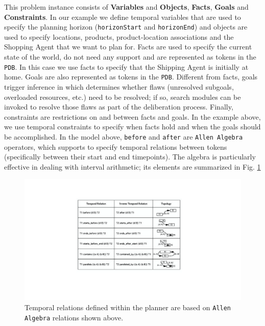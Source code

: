 This problem instance consists of \textbf{Variables} and
\textbf{Objects}, \textbf{Facts}, \textbf{Goals} and
\textbf{Constraints}. In our example we define temporal variables that
are used to specify the planning horizon (\texttt{horizonStart} and
\texttt{horizonEnd}) and objects are used to specify locations,
products, product-location associations and the Shopping Agent that we
want to plan for. Facts are used to specify the current state of the
world, do not need any support and are represented as tokens in the
\texttt{PDB}. In this case we use facts to specify that the Shipping
Agent is initially at home. Goals are also represented as tokens in
the \texttt{PDB}. Different from facts, goals trigger inference in \eu
which determines whether flaws (unresolved subgoals, overloaded
resources, etc.) need to be resolved; if so, search modules can be
invoked to resolve those flaws as part of the deliberation
process. Finally, constraints are restrictions on and between facts
and goals. In the example above, we use temporal constraints to
specify when facts hold and when the goals should be accomplished. In
the model above, \texttt{before} and \texttt{after} are \texttt{Allen
  Algebra} \cite{allen84} operators, which \eu supports to specify
temporal relations between tokens (specifically between their start
and end timepoints). The algebra is particularly effective in dealing
with interval arithmetic; its elements are summarized in
Fig. \ref{fig:allen-algebra}

\begin{figure}[!t]
\centering
\includegraphics[scale=0.4]{figs/Allen-algebra.pdf}
\caption{\small Temporal relations defined within the planner are
  based on \texttt{Allen Algebra} \cite{allen84} relations shown
  above.}
\label{fig:allen-algebra}
\end{figure}


